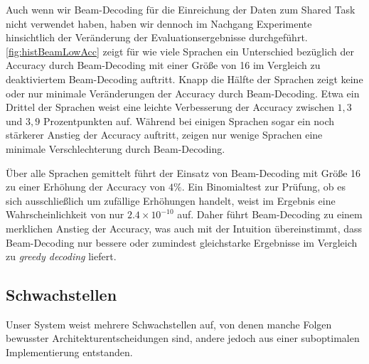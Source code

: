 \documentclass[11pt,a4paper]{article}
\begin{document}
Auch wenn wir Beam-Decoding für die Einreichung der Daten zum Shared Task nicht verwendet haben, haben wir dennoch im Nachgang Experimente hinsichtlich der Veränderung der Evaluationsergebnisse durchgeführt.
\autoref{fig:histBeamLowAcc} zeigt für wie viele Sprachen ein Unterschied bezüglich der Accuracy durch Beam-Decoding mit einer Größe von 16 im Vergleich zu deaktiviertem Beam-Decoding auftritt.
Knapp die Hälfte der Sprachen zeigt keine oder nur minimale Veränderungen der Accuracy durch Beam-Decoding.
Etwa ein Drittel der Sprachen weist eine leichte Verbesserung der Accuracy zwischen $1,3$ und $3,9$ Prozentpunkten auf.
Während bei einigen Sprachen sogar ein noch stärkerer Anstieg der Accuracy auftritt, zeigen nur wenige Sprachen eine minimale Verschlechterung durch Beam-Decoding.

Über alle Sprachen gemittelt führt der Einsatz von Beam-Decoding mit Größe 16 zu einer Erhöhung der Accuracy von $4\%$.
Ein Binomialtest zur Prüfung, ob es sich ausschließlich um zufällige Erhöhungen handelt, weist im Ergebnis eine Wahrscheinlichkeit von nur $2.4 \times 10^{-10}$ auf.
Daher führt Beam-Decoding zu einem merklichen Anstieg der Accuracy, was auch mit der Intuition übereinstimmt, dass Beam-Decoding nur bessere oder zumindest gleichstarke Ergebnisse im Vergleich zu \textit{greedy decoding} liefert.

\subsection{Schwachstellen}
\label{sec:schwachstellen}
Unser System weist mehrere Schwachstellen auf, von denen manche Folgen bewusster Architekturentscheidungen sind, andere jedoch aus einer suboptimalen Implementierung entstanden.
\end{document}
